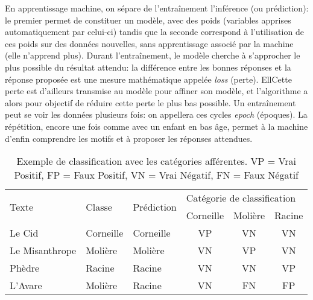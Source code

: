En apprentissage machine, on sépare de l'entraînement l'inférence (ou prédiction): le premier permet de constituer un modèle, avec des poids (variables apprises automatiquement par celui-ci) tandis que la seconde correspond à l'utilisation de ces poids sur des données nouvelles, sans apprentissage associé par la machine (elle n'apprend plus). Durant l'entraînement, le modèle cherche à s'approcher le plus possible du résultat attendu: la différence entre les bonnes réponses et la réponse proposée est une mesure mathématique appelée \textit{loss} (perte). EllCette perte est d'ailleurs transmise au modèle pour affiner son modèle, et l'algorithme a alors pour objectif de réduire cette perte le plus bas possible. Un entraînement peut se voir les données plusieurs fois: on appellera ces cycles \textit{epoch} (époques). La répétition, encore une fois comme avec un enfant en bas âge, permet à la machine d'enfin comprendre les motifs et à proposer les réponses attendues. 

\begin{table}[]
\centering
\begin{tabular}{lllccc}
\toprule
\multirow{2}{*}{Texte} & \multirow{2}{*}{Classe} & \multirow{2}{*}{Prédiction} & \multicolumn{3}{l}{Catégorie de classification} \\
                       &                         &                             & Corneille        & Molière       & Racine       \\ \midrule
Le Cid                 & Corneille               & Corneille                   & VP               & VN            & VN           \\
Le Misanthrope         & Molière                 & Molière                     & VN               & VP            & VN           \\
Phèdre                 & Racine                  & Racine                      & VN               & VN            & VP           \\
L'Avare                & Molière                 & Racine                      & VN               & FN            & FP          \\ \bottomrule
\end{tabular}
\caption{Exemple de classification avec les catégories afférentes. VP = Vrai Positif, FP = Faux Positif, VN = Vrai Négatif, FN = Faux Négatif}
\label{deep-learning:table:true-positives}
\end{table}


